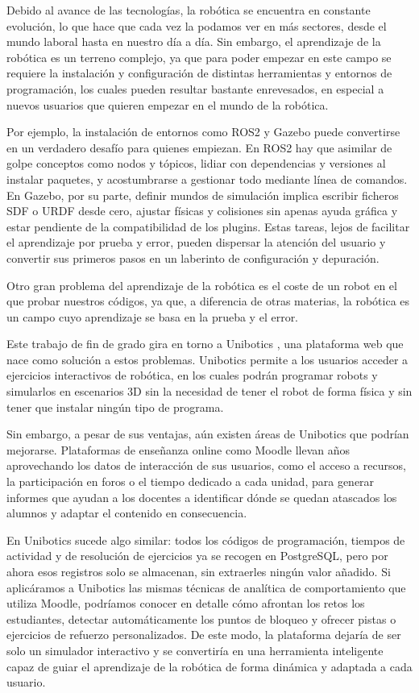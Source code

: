 \documentclass[a4paper, 12pt]{book}
\begin{document}
Debido al avance de las tecnologías, la robótica se encuentra en constante evolución, lo que hace que cada vez la podamos ver en más sectores, desde el mundo laboral hasta en nuestro día a día. Sin embargo, el aprendizaje de la robótica es un terreno complejo, ya que para poder empezar en este campo se requiere la instalación y configuración de distintas herramientas y entornos de programación, los cuales pueden resultar bastante enrevesados, en especial a nuevos usuarios que quieren empezar en el mundo de la robótica.

Por ejemplo, la instalación de entornos como ROS2 y Gazebo \cite{rico2025concise} puede convertirse en un verdadero desafío para quienes empiezan. En ROS2 hay que asimilar de golpe conceptos como nodos y tópicos, lidiar con dependencias y versiones al instalar paquetes, y acostumbrarse a gestionar todo mediante línea de comandos. En Gazebo, por su parte, definir mundos de simulación implica escribir ficheros SDF o URDF desde cero, ajustar físicas y colisiones sin apenas ayuda gráfica y estar pendiente de la compatibilidad de los plugins. Estas tareas, lejos de facilitar el aprendizaje por prueba y error, pueden dispersar la atención del usuario y convertir sus primeros pasos en un laberinto de configuración y depuración.

Otro gran problema del aprendizaje de la robótica es el coste de un robot en el que probar nuestros códigos, ya que, a diferencia de otras materias, la robótica es un campo cuyo aprendizaje se basa en la prueba y el error.

Este trabajo de fin de grado gira en torno a Unibotics \cite{uniboticsWebsite}, una plataforma web que nace como solución a estos problemas. Unibotics permite a los usuarios acceder a ejercicios interactivos de robótica, en los cuales podrán programar robots y simularlos en escenarios 3D sin la necesidad de tener el robot de forma física y sin tener que instalar ningún tipo de programa.

Sin embargo, a pesar de sus ventajas, aún existen áreas de Unibotics que podrían mejorarse. Plataformas de enseñanza online como Moodle \cite{einhardt2016moodle} llevan años aprovechando los datos de interacción de sus usuarios, como el acceso a recursos, la participación en foros o el tiempo dedicado a cada unidad, para generar informes que ayudan a los docentes a identificar dónde se quedan atascados los alumnos y adaptar el contenido en consecuencia.

En Unibotics sucede algo similar: todos los códigos de programación, tiempos de actividad y de resolución de ejercicios ya se recogen en PostgreSQL, pero por ahora esos registros solo se almacenan, sin extraerles ningún valor añadido. Si aplicáramos a Unibotics las mismas técnicas de analítica de comportamiento que utiliza Moodle, podríamos conocer en detalle cómo afrontan los retos los estudiantes, detectar automáticamente los puntos de bloqueo y ofrecer pistas o ejercicios de refuerzo personalizados. De este modo, la plataforma dejaría de ser solo un simulador interactivo y se convertiría en una herramienta inteligente capaz de guiar el aprendizaje de la robótica de forma dinámica y adaptada a cada usuario.
\end{document}

